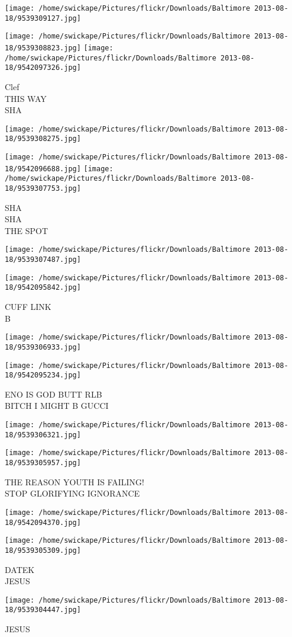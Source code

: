 \documentclass[10pt,letterpaper]{article}
\begin{document}
\texttt{[image: /home/swickape/Pictures/flickr/Downloads/Baltimore 2013-08-18/9539309127.jpg]}

\vspace{0.25in}
\texttt{[image: /home/swickape/Pictures/flickr/Downloads/Baltimore 2013-08-18/9539308823.jpg]}
\texttt{[image: /home/swickape/Pictures/flickr/Downloads/Baltimore 2013-08-18/9542097326.jpg]}

Clef\\
THIS WAY\\
SHA
\pagebreak

\texttt{[image: /home/swickape/Pictures/flickr/Downloads/Baltimore 2013-08-18/9539308275.jpg]}

\vspace{0.25in}
\texttt{[image: /home/swickape/Pictures/flickr/Downloads/Baltimore 2013-08-18/9542096688.jpg]}
\texttt{[image: /home/swickape/Pictures/flickr/Downloads/Baltimore 2013-08-18/9539307753.jpg]}

SHA\\
SHA\\
THE SPOT
\pagebreak

\texttt{[image: /home/swickape/Pictures/flickr/Downloads/Baltimore 2013-08-18/9539307487.jpg]}

\vspace{0.25in}
\texttt{[image: /home/swickape/Pictures/flickr/Downloads/Baltimore 2013-08-18/9542095842.jpg]}

CUFF LINK\\
B
\pagebreak

\texttt{[image: /home/swickape/Pictures/flickr/Downloads/Baltimore 2013-08-18/9539306933.jpg]}

\vspace{0.25in}
\texttt{[image: /home/swickape/Pictures/flickr/Downloads/Baltimore 2013-08-18/9542095234.jpg]}

ENO IS GOD BUTT RLB\\
BITCH I MIGHT B GUCCI
\pagebreak

\texttt{[image: /home/swickape/Pictures/flickr/Downloads/Baltimore 2013-08-18/9539306321.jpg]}

\vspace{0.25in}
\texttt{[image: /home/swickape/Pictures/flickr/Downloads/Baltimore 2013-08-18/9539305957.jpg]}

THE REASON YOUTH IS FAILING!\\
STOP GLORIFYING IGNORANCE
\pagebreak

\texttt{[image: /home/swickape/Pictures/flickr/Downloads/Baltimore 2013-08-18/9542094370.jpg]}

\vspace{0.25in}
\texttt{[image: /home/swickape/Pictures/flickr/Downloads/Baltimore 2013-08-18/9539305309.jpg]}

DATEK\\
JESUS
\pagebreak

\texttt{[image: /home/swickape/Pictures/flickr/Downloads/Baltimore 2013-08-18/9539304447.jpg]}

JESUS
\pagebreak
\end{document}
